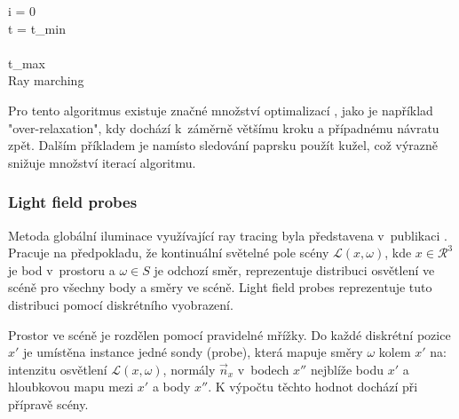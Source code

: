 \begin{center}
	\begin{czechalgorithm}[H] \label{alg:ray_marching}
		i = 0\\
		t = t\_min\\
		\\
		\KwRet t\_max\\
		\caption{Ray marching}
	\end{czechalgorithm}
\end{center}

Pro tento algoritmus existuje značné množství optimalizací \cite{Keinert2014EnhancedST}, jako je například "over-relaxation", kdy dochází k~záměrně většímu kroku a případnému návratu zpět. Dalším příkladem je namísto sledování paprsku použít kužel, což výrazně snižuje množství iterací algoritmu.


\subsubsection{Light field probes} \label{sec:light_field_probes}
Metoda globální iluminace využívající ray tracing byla představena v~publikaci \cite{light_field_probes}. Pracuje na předpokladu, že kontinuální světelné pole scény $\mathcal{L}(x, \omega)$, kde $x \in \mathcal{R}^3$ je bod v~prostoru a $\omega \in S$ je odchozí směr, reprezentuje distribuci osvětlení ve scéně pro všechny body a směry ve scéně. Light field probes reprezentuje tuto distribuci pomocí diskrétního vyobrazení.

Prostor ve scéně je rozdělen pomocí pravidelné mřížky. Do každé diskrétní pozice $x'$ je umístěna instance jedné sondy (probe), která mapuje směry $\omega$ kolem $x'$ na: intenzitu osvětlení $\mathcal{L}(x, \omega)$, normály $\vec{n}_x$ v~bodech $x''$ nejblíže bodu $x'$ a hloubkovou mapu mezi $x'$ a body $x''$. K výpočtu těchto hodnot dochází při přípravě scény.

